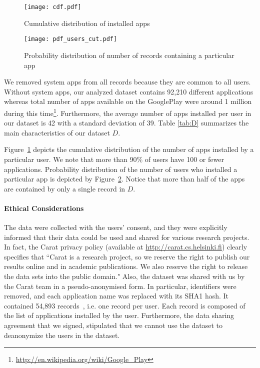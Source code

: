 \documentclass{acm_proc_article-sp}
\theoremstyle{plain}
\theoremstyle{plain}
\theoremstyle{plain}
\theoremstyle{plain}
\theoremstyle{plain}
\theoremstyle{plain}
\begin{document}
\begin{figure}[h]
	\centering
	\texttt{[image: cdf.pdf]}
	\caption{Cumulative distribution of installed apps}
	\label{fig:cdf}
\end{figure}


\begin{figure}[h]
	\centering
	\texttt{[image: pdf\_users\_cut.pdf]}
	\caption{Probability distribution of number of records containing a particular app}
	\label{fig:pdf_users_cut}
\end{figure}

We removed system apps from all records because they are common to all users.
Without system apps, our analyzed dataset contains 92,210 different applications whereas total number of apps available on the GooglePlay were around 1 million during this time\footnote{\url{http://en.wikipedia.org/wiki/Google_Play}}.
Furthermore, the average number of apps installed per user in our dataset is 42 with a standard deviation of 39.
Table \ref{tab:D} summarizes the main characteristics of our dataset $D$.

Figure~\ref{fig:cdf} depicts the cumulative distribution of the number of apps installed by a particular user.
We note that more than 90\% of users have 100 or fewer applications. 
Probability distribution of the number of users who installed a particular app is depicted by Figure~\ref{fig:pdf_users_cut}.
Notice that more than half of the apps are contained by only a single record in $D$.

\paragraph{Ethical Considerations}
The data were collected with the users' consent, and they were explicitly informed that their data could be used and shared for various research projects.
In fact, the Carat privacy policy (available at \url{http://carat.cs.helsinki.fi}) clearly specifies that ``Carat is a research project, so we reserve the right to publish our results online and in academic publications. 
We also reserve the right to release the data sets into the public domain."
Also, the dataset was shared with us by the Carat team in a pseudo-anonymised form. 
In particular, identifiers were removed, and each application name was replaced with its SHA1 hash. 
It contained 54,893 records~\cite{Truong:2014}, i.e. one record per user. 
Each record is composed of the list of applications installed by the user.
Furthermore, the data sharing agreement that we signed, stipulated that we cannot use the dataset to deanonymize the users in the dataset.
\end{document}
